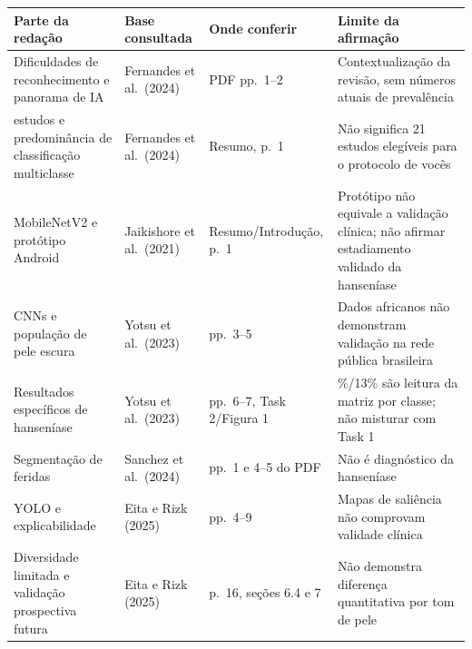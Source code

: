 \documentclass[
]{article}
\newcounter{none} %
\begin{document}
{\def\LTcaptype{none} %
\begin{longtable}[]{@{}
  >{\raggedright\arraybackslash}p{}
  >{\raggedright\arraybackslash}p{}
  >{\raggedright\arraybackslash}p{}
  >{\raggedright\arraybackslash}p{}@{}}
\toprule\noalign{}
\begin{minipage}[b]{\linewidth}\raggedright
Parte da redação
\end{minipage} & \begin{minipage}[b]{\linewidth}\raggedright
Base consultada
\end{minipage} & \begin{minipage}[b]{\linewidth}\raggedright
Onde conferir
\end{minipage} & \begin{minipage}[b]{\linewidth}\raggedright
Limite da afirmação
\end{minipage} \\
\midrule\noalign{}
\endhead
\bottomrule\noalign{}
\endlastfoot
Dificuldades de reconhecimento e panorama de IA & Fernandes et
al.~(2024) & PDF pp.~1--2 & Contextualização da revisão, sem números
atuais de prevalência \\
21 estudos e predominância de classificação multiclasse & Fernandes et
al.~(2024) & Resumo, p.~1 & Não significa 21 estudos elegíveis para o
protocolo de vocês \\
MobileNetV2 e protótipo Android & Jaikishore et al.~(2021) &
Resumo/Introdução, p.~1 & Protótipo não equivale a validação clínica;
não afirmar estadiamento validado da hanseníase \\
CNNs e população de pele escura & Yotsu et al.~(2023) & pp.~3--5 & Dados
africanos não demonstram validação na rede pública brasileira \\
Resultados específicos de hanseníase & Yotsu et al.~(2023) & pp.~6--7,
Task 2/Figura 1 & 12\%/13\% são leitura da matriz por classe; não
misturar com Task 1 \\
Segmentação de feridas & Sanchez et al.~(2024) & pp.~1 e 4--5 do PDF &
Não é diagnóstico da hanseníase \\
YOLO e explicabilidade & Eita e Rizk (2025) & pp.~4--9 & Mapas de
saliência não comprovam validade clínica \\
Diversidade limitada e validação prospectiva futura & Eita e Rizk (2025)
& p.~16, seções 6.4 e 7 & Não demonstra diferença quantitativa por tom
de pele \\
\end{longtable}
}
\end{document}
